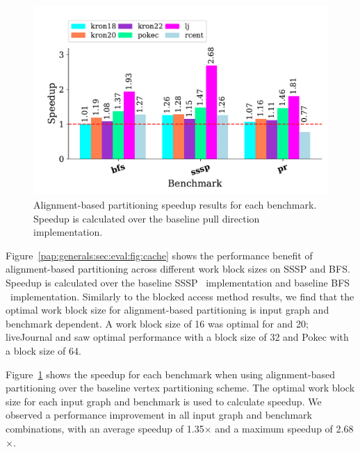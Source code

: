 \begin{figure}[h!]
    \centering
    \includegraphics[scale = 0.6]{graphit-figures/align.pdf}
    \caption{Alignment-based partitioning speedup results for each benchmark. Speedup is calculated over the baseline pull direction implementation.} %
    \label{pap:generals:sec:eval:fig:aligned}
\end{figure}
 
Figure~\ref{pap:generals:sec:eval:fig:cache} shows the performance benefit of alignment-based partitioning across different work block sizes on SSSP and BFS.
Speedup is calculated over the baseline SSSP \pull~implementation and baseline BFS \pull~implementation. 
Similarly to the blocked access method results, we find that the optimal work block size for alignment-based partitioning is input graph and benchmark dependent. 
A work block size of 16 was optimal for  and 20; liveJournal and  saw optimal performance with a block size of 32 and Pokec with a block size of 64.

Figure~\ref{pap:generals:sec:eval:fig:aligned} shows the speedup for each benchmark when using alignment-based partitioning over the baseline vertex partitioning scheme. 
The optimal work block size for each input graph and benchmark is used to calculate speedup. 
We observed a performance improvement in all input graph and benchmark combinations, with an average speedup of 1.35$\times$ and a maximum speedup of 2.68$\times$. 
 
